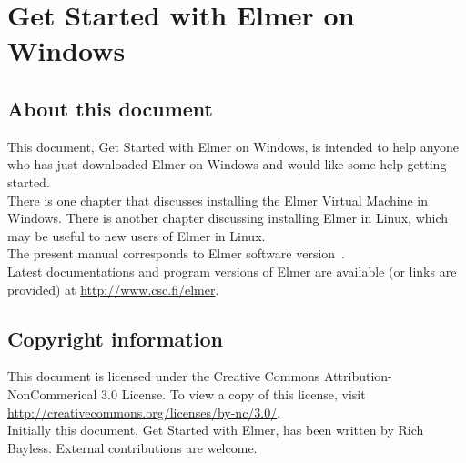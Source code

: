 \chapter*{Get Started with Elmer on Windows}

\section*{About this document}

This document, Get Started with Elmer on Windows, is intended to help anyone who has just downloaded Elmer on Windows and would like some help getting started.\\

There is one chapter that discusses installing the Elmer Virtual Machine in Windows.  There is another chapter discussing installing Elmer in Linux, which may be useful to new users of Elmer in Linux.\\


The present manual corresponds to Elmer software version~\elmerversion{}.\\

Latest documentations and program versions of Elmer are available (or links are provided) at \url{http://www.csc.fi/elmer}. \\

\section*{Copyright information}

This document is licensed under the Creative Commons Attribution-NonCommerical 3.0 License.  To view a copy of this license, visit \url{http://creativecommons.org/licenses/by-nc/3.0/}.\\

Initially this document, Get Started with Elmer, has been written by Rich Bayless.  External contributions are welcome.



